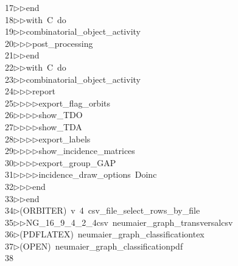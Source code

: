 \begin{tabbing}
17\>$\triangleright$\>$\triangleright$\>end\ \\[0pt]
18\>$\triangleright$\>$\triangleright$\>with\ C\ do\ \\[0pt]
19\>$\triangleright$\>$\triangleright$\>combinatorial\_object\_activity\ \\[0pt]
20\>$\triangleright$\>$\triangleright$\>$\triangleright$\>post\_processing\ \\[0pt]
21\>$\triangleright$\>$\triangleright$\>end\ \\[0pt]
22\>$\triangleright$\>$\triangleright$\>with\ C\ do\ \\[0pt]
23\>$\triangleright$\>$\triangleright$\>combinatorial\_object\_activity\ \\[0pt]
24\>$\triangleright$\>$\triangleright$\>$\triangleright$\>report\ \\[0pt]
25\>$\triangleright$\>$\triangleright$\>$\triangleright$\>$\triangleright$\>export\_flag\_orbits\ \\[0pt]
26\>$\triangleright$\>$\triangleright$\>$\triangleright$\>$\triangleright$\>show\_TDO\ \\[0pt]
27\>$\triangleright$\>$\triangleright$\>$\triangleright$\>$\triangleright$\>show\_TDA\ \\[0pt]
28\>$\triangleright$\>$\triangleright$\>$\triangleright$\>$\triangleright$\>export\_labels\ \\[0pt]
29\>$\triangleright$\>$\triangleright$\>$\triangleright$\>$\triangleright$\>show\_incidence\_matrices\ \\[0pt]
30\>$\triangleright$\>$\triangleright$\>$\triangleright$\>$\triangleright$\>export\_group\_GAP\ \\[0pt]
31\>$\triangleright$\>$\triangleright$\>$\triangleright$\>$\triangleright$\>incidence\_draw\_options\ Doinc\ \\[0pt]
32\>$\triangleright$\>$\triangleright$\>$\triangleright$\>end\ \\[0pt]
33\>$\triangleright$\>$\triangleright$\>end\\[0pt]
34\>$\triangleright$\>(ORBITER)\ v\ 4\ csv\_file\_select\_rows\_by\_file\ \\[0pt]
35\>$\triangleright$\>$\triangleright$\>NG\_16\_9\_4\_2\_4csv\ neumaier\_graph\_transversalcsv\\[0pt]
36\>$\triangleright$\>(PDFLATEX)\ neumaier\_graph\_classificationtex\\[0pt]
37\>$\triangleright$\>(OPEN)\ neumaier\_graph\_classificationpdf\\[0pt]
38\>\end{tabbing}
